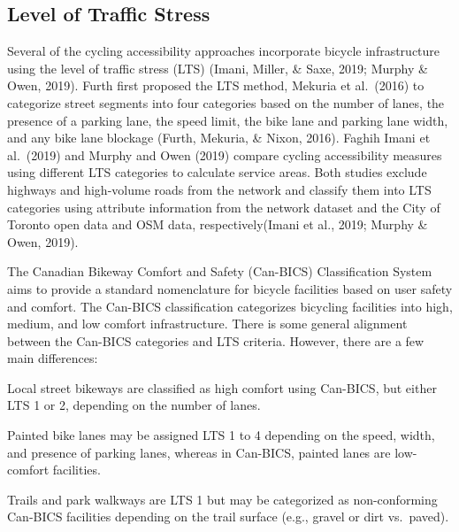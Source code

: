 \documentclass[
11pt, %
oneside, %
english, %
singlespacing, %
]{macthesis} %
\begin{document}
\subsection{Level of Traffic Stress}\label{level-of-traffic-stress}

Several of the cycling accessibility approaches incorporate bicycle infrastructure using the level of traffic stress (LTS) (Imani, Miller, \& Saxe, 2019; Murphy \& Owen, 2019). Furth first proposed the LTS method, Mekuria et al.~(2016) to categorize street segments into four categories based on the number of lanes, the presence of a parking lane, the speed limit, the bike lane and parking lane width, and any bike lane blockage (Furth, Mekuria, \& Nixon, 2016). Faghih Imani et al.~(2019) and Murphy and Owen (2019) compare cycling accessibility measures using different LTS categories to calculate service areas. Both studies exclude highways and high-volume roads from the network and classify them into LTS categories using attribute information from the network dataset and the City of Toronto open data and OSM data, respectively(Imani et al., 2019; Murphy \& Owen, 2019).

The Canadian Bikeway Comfort and Safety (Can-BICS) Classification System aims to provide a standard nomenclature for bicycle facilities based on user safety and comfort. The Can-BICS classification categorizes bicycling facilities into high, medium, and low comfort infrastructure. There is some general alignment between the Can-BICS categories and LTS criteria. However, there are a few main differences:

Local street bikeways are classified as high comfort using Can-BICS, but either LTS 1 or 2, depending on the number of lanes.

Painted bike lanes may be assigned LTS 1 to 4 depending on the speed, width, and presence of parking lanes, whereas in Can-BICS, painted lanes are low-comfort facilities.

Trails and park walkways are LTS 1 but may be categorized as non-conforming Can-BICS facilities depending on the trail surface (e.g., gravel or dirt vs.~paved).

\begingroup\fontsize{12}{14}\selectfont
\end{document}
